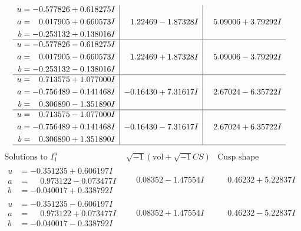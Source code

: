 \documentclass[1p]{elsarticle_modified}
\theoremstyle{definition}
\newcommand{\I}{\sqrt{-1}}
\begin{document}
$$\begin{array}{c|c|c}
\begin{aligned}
u &= -0.577826 + 0.618275 I \\
a &= \phantom{-}0.017905 + 0.660573 I \\
b &= -0.253132 + 0.138016 I\end{aligned}
 & \phantom{-}1.22469 - 1.87328 I & \phantom{-}5.09006 + 3.79292 I \\ \hline\begin{aligned}
u &= -0.577826 - 0.618275 I \\
a &= \phantom{-}0.017905 - 0.660573 I \\
b &= -0.253132 - 0.138016 I\end{aligned}
 & \phantom{-}1.22469 + 1.87328 I & \phantom{-}5.09006 - 3.79292 I \\ \hline\begin{aligned}
u &= \phantom{-}0.713575 + 1.077000 I \\
a &= -0.756489 - 0.141468 I \\
b &= \phantom{-}0.306890 - 1.351890 I\end{aligned}
 & -0.16430 + 7.31617 I & \phantom{-}2.67024 - 6.35722 I \\ \hline\begin{aligned}
u &= \phantom{-}0.713575 - 1.077000 I \\
a &= -0.756489 + 0.141468 I \\
b &= \phantom{-}0.306890 + 1.351890 I\end{aligned}
 & -0.16430 - 7.31617 I & \phantom{-}2.67024 + 6.35722 I\\
 \hline 
 \end{array}$$\newpage$$\begin{array}{c|c|c}  
\text{Solutions to }I^u_{1}& \I (\text{vol} + \sqrt{-1}CS) & \text{Cusp shape}\\
 \hline 
\begin{aligned}
u &= -0.351235 + 0.606197 I \\
a &= \phantom{-}0.973122 - 0.073477 I \\
b &= -0.040017 + 0.338792 I\end{aligned}
 & \phantom{-}0.08352 - 1.47554 I & \phantom{-}0.46232 + 5.22837 I \\ \hline\begin{aligned}
u &= -0.351235 - 0.606197 I \\
a &= \phantom{-}0.973122 + 0.073477 I \\
b &= -0.040017 - 0.338792 I\end{aligned}
 & \phantom{-}0.08352 + 1.47554 I & \phantom{-}0.46232 - 5.22837 I \\ \hline\begin{aligned}

\end{aligned}
\end{array}$$
\end{document}
